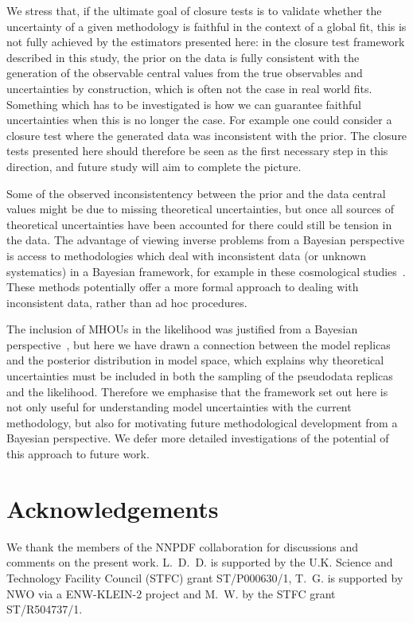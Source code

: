 We stress that, if the ultimate goal of closure tests is 
to validate whether the uncertainty of a given methodology is faithful
in the context of a global fit, this is not fully achieved by the estimators presented here:
in the closure test framework described in this study, the prior on the data is
fully consistent with the generation of the observable central values from the
true observables and uncertainties by construction, which is often not the case
in real world fits. Something which has to be investigated is how we can
guarantee faithful uncertainties when this is no longer the case. For example
one could consider a closure test where the generated data was inconsistent with
the prior. The closure tests presented here should therefore be seen as the first necessary step 
in this direction, and future study will aim to complete the picture.

Some of the observed inconsistentency between the prior and the data central
values might be due to missing theoretical uncertainties, but once all sources
of theoretical uncertainties have been accounted for there could still be
tension in the data. The advantage of viewing inverse problems from a Bayesian
perspective is access to methodologies which deal with inconsistent data (or
unknown systematics) in a Bayesian framework, for example in these cosmological
studies~\cite{Luis_Bernal_2018,Hobson_2002}. These methods potentially offer a
more formal approach to dealing with inconsistent data, rather than ad hoc
procedures.

The inclusion of MHOUs in the likelihood was justified from a Bayesian
perspective~\cite{AbdulKhalek:2019ihb}, but here we have drawn a connection
between the model replicas and the posterior distribution in model space, which
explains why theoretical uncertainties must be included in both the sampling of
the pseudodata replicas and the likelihood. Therefore we emphasise that the
framework set out here is not only useful for understanding model uncertainties
with the current methodology, but also for motivating future methodological
development from a Bayesian perspective. We defer more detailed investigations
of the potential of this approach to future work. 

\section*{Acknowledgements}
We thank the members of the NNPDF collaboration for discussions and comments on the present work. 
L.~D.~D. is supported by the U.K. Science and Technology Facility Council
(STFC) grant ST/P000630/1, T.~G. is supported by NWO via a ENW-KLEIN-2 project and
M.~W. by the STFC grant ST/R504737/1.
